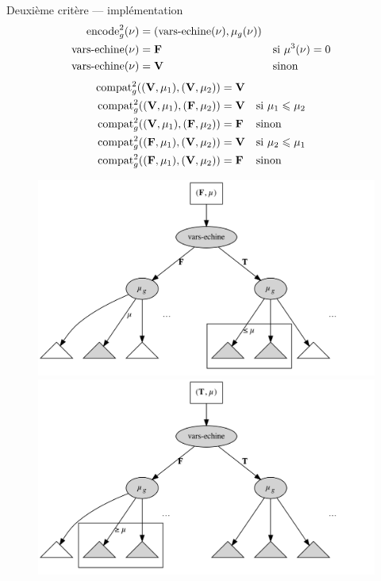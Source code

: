 \documentclass[serif]{beamer}
\newcommand{\mathhyphen}{{\hbox{-}}}
\begin{document}
\begin{frame}{Deuxième critère — implémentation}
\tiny
\begin{align*}
		\mathrm{encode}^2_g (\nu) &=
		(\mathrm{vars\mathhyphen echine} (\nu), \mu_g (\nu))
	\\
		\mathrm{vars\mathhyphen echine} (\nu) &=
		\bold{F} &&
		\text{si } \mu^3 (\nu) = 0
	\\
		\mathrm{vars\mathhyphen echine} (\nu) &=
		\bold{V} &&
		\text{sinon}
\end{align*}
\begin{align*}
		\mathrm{compat}^2_g ((\bold{V}, \mu_1), (\bold{V}, \mu_2)) &=
		\bold{V}
	\\
		\mathrm{compat}^2_g ((\bold{V}, \mu_1), (\bold{F}, \mu_2)) &=
		\bold{V} &&
		\text{si } \mu_1 \leqslant \mu_2
	\\
		\mathrm{compat}^2_g ((\bold{V}, \mu_1), (\bold{F}, \mu_2)) &=
		\bold{F} &&
		\text{sinon}
	\\
		\mathrm{compat}^2_g ((\bold{F}, \mu_1), (\bold{V}, \mu_2)) &=
		\bold{V} &&
		\text{si } \mu_2 \leqslant \mu_1
	\\
		\mathrm{compat}^2_g ((\bold{F}, \mu_1), (\bold{V}, \mu_2)) &=
		\bold{F} &&
		\text{sinon}
\end{align*}
\begin{figure}[h]
	\centering
	\includegraphics[scale=0.09]{graphs/crit2_1}
	\includegraphics[scale=0.09]{graphs/crit2_2}
\end{figure}
\end{frame}
\end{document}
